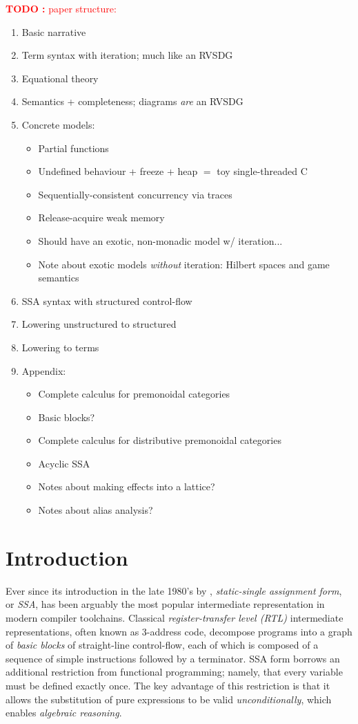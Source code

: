 \documentclass[acmsmall,screen,review]{acmart}
\newcounter{todos}
\newcommand{\TODO}[1]{{
  \stepcounter{todos}
  \begin{center}\large{\textcolor{red}{\textbf{TODO \arabic{todos}:} #1}}\end{center}
}}
\begin{document}
\TODO{paper structure:}
\begin{enumerate}
  \item Basic narrative
  \item Term syntax with iteration; much like an RVSDG \cite{rvsdg}
  \item Equational theory
  \item Semantics + completeness; diagrams \emph{are} an RVSDG
  \item Concrete models:
  \begin{itemize}
    \item Partial functions
    \item Undefined behaviour + freeze + heap $=$ toy single-threaded C
    \item Sequentially-consistent concurrency via traces
    \item Release-acquire weak memory
    \item Should have an exotic, non-monadic model w/ iteration...
    \item Note about exotic models \emph{without} iteration: Hilbert spaces and game semantics
  \end{itemize}
  \item SSA syntax with structured control-flow
  \item Lowering unstructured to structured
  \item Lowering to terms
  \item Appendix:
  \begin{itemize}
    \item Complete calculus for premonoidal categories
    \item Basic blocks?
    \item Complete calculus for distributive premonoidal categories
    \item Acyclic SSA
    \item Notes about making effects into a lattice?
    \item Notes about alias analysis?
  \end{itemize}
\end{enumerate}

\section{Introduction}

Ever since its introduction in the late 1980's by \citet{alpern-ssa-original-88},
\emph{static-single assignment form}, or \emph{SSA}, has been arguably the most popular intermediate
representation in modern compiler toolchains. Classical \emph{register-transfer level (RTL)}
intermediate representations, often known as 3-address code, decompose programs into a graph of
\emph{basic blocks} of straight-line control-flow, each of which is composed of a sequence of simple
instructions followed by a terminator. SSA form borrows an additional restriction from functional
programming; namely, that every variable must be defined exactly once. The key advantage of this
restriction is that it allows the substitution of pure expressions to be valid
\emph{unconditionally}, which enables \emph{algebraic reasoning}.
\end{document}
